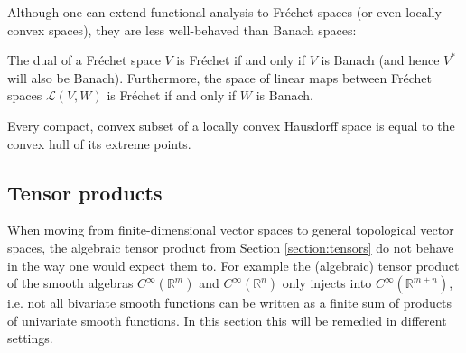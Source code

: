     Although one can extend functional analysis to Fr\'echet spaces (or even locally convex spaces), they are less well-behaved than Banach spaces:
    \begin{property}
        The dual of a Fr\'echet space $V$ is Fr\'echet if and only if $V$ is Banach (and hence $V^*$ will also be Banach). Furthermore, the space of linear maps between Fr\'echet spaces $\mathcal{L}(V,W)$ is Fr\'echet if and only if $W$ is Banach.
    \end{property}

    \begin{property}\label{functional:krein_milman}
        Every compact, convex subset of a locally convex Hausdorff space is equal to the convex hull of its extreme points.
    \end{property}

\subsection{Tensor products}

    When moving from finite-dimensional vector spaces to general topological vector spaces, the algebraic tensor product from Section \ref{section:tensors} do not behave in the way one would expect them to. For example the (algebraic) tensor product of the smooth algebras $C^\infty(\mathbb{R}^m)$ and $C^\infty(\mathbb{R}^n)$ only injects into $C^\infty(\mathbb{R}^{m+n})$, i.e. not all bivariate smooth functions can be written as a finite sum of products of univariate smooth functions. In this section this will be remedied in different settings.



